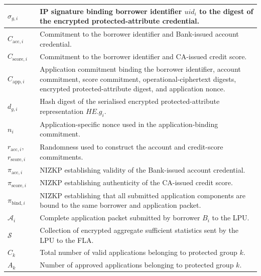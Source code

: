 \documentclass[a4paper,fleqn]{cas-dc}
\begin{document}
\begin{table}[htbp]
\begin{tabular}{|p{2.6cm}|p{11.4cm}|}
$\sigma_{g,i}$
& IP signature binding borrower identifier $uid_i$ to the digest of the encrypted protected-attribute credential. \\
\hline

$C_{\mathrm{acc},i}$
& Commitment to the borrower identifier and Bank-issued account credential. \\
\hline

$C_{\mathrm{score},i}$
& Commitment to the borrower identifier and CA-issued credit score. \\
\hline

$C_{\mathrm{app},i}$
&
Application commitment binding the borrower identifier, account commitment,
score commitment, operational-ciphertext digests, encrypted
protected-attribute digest, and application nonce. \\
\hline

$d_{g,i}$
& Hash digest of the serialised encrypted protected-attribute representation $HE.g_i$. \\
\hline

$n_i$
& Application-specific nonce used in the application-binding commitment. \\
\hline

$r_{\mathrm{acc},i}$, $r_{\mathrm{score},i}$
& Randomness used to construct the account and credit-score commitments. \\
\hline

$\pi_{\mathrm{acc},i}$
& NIZKP establishing validity of the Bank-issued account credential. \\
\hline

$\pi_{\mathrm{score},i}$
& NIZKP establishing authenticity of the CA-issued credit score. \\
\hline


$\pi_{\mathrm{bind},i}$
& NIZKP establishing that all submitted application components are bound to the same borrower and application packet. \\
\hline

$\mathcal{A}_i$
& Complete application packet submitted by borrower $B_i$ to the LPU. \\
\hline

$\mathcal{S}$
& Collection of encrypted aggregate sufficient statistics sent by the LPU to the FLA. \\
\hline

$C_k$
& Total number of valid applications belonging to protected group $k$. \\
\hline

$A_k$
& Number of approved applications belonging to protected group $k$. \\
\hline


\end{tabular}
\end{table}
\end{document}
